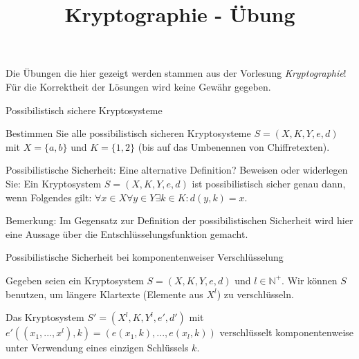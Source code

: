 \documentclass[10pt, a4paper]{exam}
\title{Kryptographie - Übung}
\author{}
\date{}
\begin{document}
\begin{myboxii}[Disclaimer]
  Die Übungen die hier gezeigt werden stammen aus der Vorlesung \textit{Kryptographie}! Für die Korrektheit der Lösungen wird keine Gewähr gegeben.
\end{myboxii}

\begin{questions}
  \question Possibilistisch sichere Kryptosysteme

  Bestimmen Sie alle possibilistisch sicheren Kryptosysteme $S=(X,K,Y,e,d)$ mit $X=\{a,b\}$ und $K=\{1,2\}$ (bis auf das Umbenennen von Chiffretexten).
  \begin{solution}
  \end{solution}

  \question Possibilistische Sicherheit: Eine alternative Definition?
  Beweisen oder widerlegen Sie: Ein Kryptosystem $S=(X,K,Y,e,d)$ ist possibilistisch sicher genau dann, wenn Folgendes gilt: $\forall x\in  X\forall y\in  Y\exists k\in K:d(y,k)=x$.
  \begin{solution}
  \end{solution}

  Bemerkung: Im Gegensatz zur Definition der possibilistischen Sicherheit wird hier eine Aussage über die Entschlüsselungsfunktion gemacht.

  \question Possibilistische Sicherheit bei komponentenweiser Verschlüsselung

  Gegeben seien ein Kryptosystem $S=(X,K,Y,e,d)$ und $l\in\mathbb{N}^+$. Wir können $S$ benutzen, um längere Klartexte (Elemente aus $X^l$) zu verschlüsseln.

  Das Kryptosystem $S'=(X^l,K,Y^l,e',d')$ mit $e'((x_1,...,x^l),k)=(e(x_1,k),...,e(x_l,k))$ verschlüsselt komponentenweise unter Verwendung eines einzigen Schlüssels $k$.


\end{questions}
\end{document}

